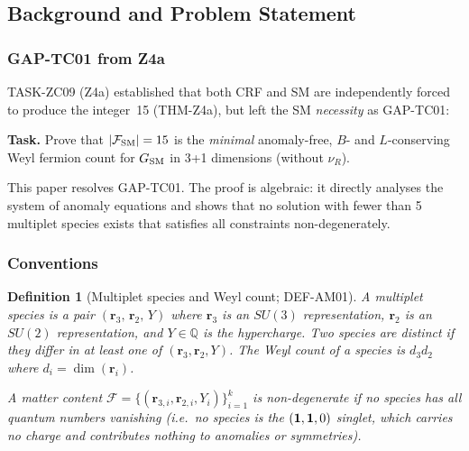 \documentclass[12pt, a4paper]{article}
\newtheorem{definition}{Definition}[section]
\begin{document}
\subsection{Background and Problem Statement}
\label{sec:setup}

\subsubsection{GAP-TC01 from Z4a}

TASK-ZC09 (Z4a) established that both CRF and SM are independently
forced to produce the integer~15 (THM-Z4a), but left the SM
\emph{necessity} as GAP-TC01:

\begin{openqbox}[title={GAP-TC01 (as stated in TASK-ZC09 Z4a)}]
\textbf{Task.} Prove that $|\mathcal{F}_{\rm SM}| = 15$ is the
\emph{minimal} anomaly-free, $B$- and $L$-conserving Weyl fermion
count for $G_{\rm SM}$ in 3+1 dimensions (without $\nu_R$).
\end{openqbox}

This paper resolves GAP-TC01. The proof is algebraic: it directly
analyses the system of anomaly equations and shows that no solution
with fewer than 5 multiplet species exists that satisfies all
constraints non-degenerately.

\subsubsection{Conventions}

\begin{definition}[Multiplet species and Weyl count; DEF-AM01]
\label{def:multiplet}
A \emph{multiplet species} is a pair $(\mathbf{r}_3,\, \mathbf{r}_2,\, Y)$
where $\mathbf{r}_3$ is an $SU(3)$ representation, $\mathbf{r}_2$
is an $SU(2)$ representation, and $Y \in \mathbb{Q}$ is the
hypercharge. Two species are \emph{distinct} if they differ in at
least one of $(\mathbf{r}_3, \mathbf{r}_2, Y)$. The \emph{Weyl count}
of a species is $d_3 d_2$ where $d_i = \dim(\mathbf{r}_i)$.

A \emph{matter content} $\mathcal{F} = \{(\mathbf{r}_{3,i}, \mathbf{r}_{2,i},
Y_i)\}_{i=1}^{k}$ is \emph{non-degenerate} if no species has all
quantum numbers vanishing (i.e.\ no species is the $({\bf 1},{\bf 1},0)$
singlet, which carries no charge and contributes nothing to anomalies
or symmetries).
\end{definition}
\end{document}
